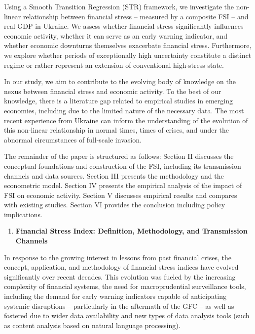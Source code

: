 \documentclass[12pt,preprint,aps,author-year]{revtex4-1}
\begin{document}
Using a Smooth Transition Regression (STR) framework, we investigate the non-linear relationship between financial stress – measured by a composite FSI – and real GDP in Ukraine. We assess whether financial stress significantly influences economic activity, whether it can serve as an early warning indicator, and whether economic downturns themselves exacerbate financial stress. Furthermore, we explore whether periods of exceptionally high uncertainty constitute a distinct regime or rather represent an extension of conventional high-stress state.

In our study, we aim to contribute to the evolving body of knowledge on the nexus between financial stress and economic activity. To the best of our knowledge, there is a literature gap related to empirical studies in emerging economies, including due to the limited nature of the necessary data. The most recent experience from Ukraine can inform the understanding of the evolution of this non-linear relationship in normal times, times of crises, and under the abnormal circumstances of full-scale invasion.

The remainder of the paper is structured as follows: Section II discusses the conceptual foundations and construction of the FSI, including its transmission channels and data sources. Section III presents the methodology and the econometric model. Section IV presents the empirical analysis of the impact of FSI on economic activity. Section V discusses empirical results and compares with existing studies. Section VI provides the conclusion including policy implications.

\begin{enumerate}
\item \textbf{Financial Stress Index: Definition, Methodology, and Transmission Channels}
\end{enumerate}
In response to the growing interest in lessons from past financial crises, the concept, application, and methodology of financial stress indices have evolved significantly over recent decades. This evolution was fueled by the increasing complexity of financial systems, the need for macroprudential surveillance tools, including the demand for early warning indicators capable of anticipating systemic disruptions – particularly in the aftermath of the GFC – as well as fostered due to wider data availability and new types of data analysis tools (such as content analysis based on natural language processing).
\end{document}
